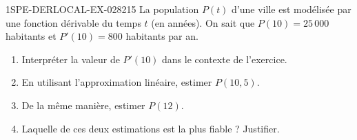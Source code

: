 \begin{exercice}{1SPE-DERLOCAL-EX-028}{2}{15}
La population $P(t)$ d'une ville est modélisée par une fonction dérivable du temps $t$ (en années). On sait que $P(10) = 25\,000$ habitants et $P'(10) = 800$ habitants par an.

\begin{enumerate}
  \item Interpréter la valeur de $P'(10)$ dans le contexte de l'exercice.
  \item En utilisant l'approximation linéaire, estimer $P(10{,}5)$.
  \item De la même manière, estimer $P(12)$.
  \item Laquelle de ces deux estimations est la plus fiable ? Justifier.
\end{enumerate}
\end{exercice}
